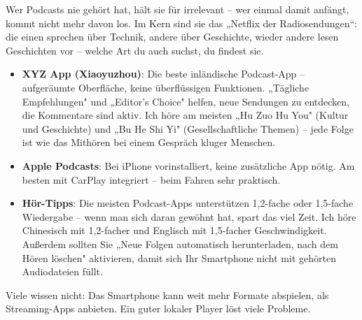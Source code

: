 
Wer Podcasts nie gehört hat, hält sie für irrelevant – wer einmal damit anfängt, kommt nicht mehr davon los. Im Kern sind sie das „Netflix der Radiosendungen“: die einen sprechen über Technik, andere über Geschichte, wieder andere lesen Geschichten vor – welche Art du auch suchst, du findest sie.

\begin{itemize}
  \item \textbf{XYZ App (Xiaoyuzhou)}: Die beste inländische Podcast-App – aufgeräumte Oberfläche, keine überflüssigen Funktionen. „Tägliche Empfehlungen" und „Editor's Choice" helfen, neue Sendungen zu entdecken, die Kommentare sind aktiv. Ich höre am meisten „Hu Zuo Hu You" (Kultur und Geschichte) und „Bu He Shi Yi" (Gesellschaftliche Themen) – jede Folge ist wie das Mithören bei einem Gespräch kluger Menschen.
  \item \textbf{Apple Podcasts}: Bei iPhone vorinstalliert, keine zusätzliche App nötig. Am besten mit CarPlay integriert – beim Fahren sehr praktisch.
  \item \textbf{Hör-Tipps}: Die meisten Podcast-Apps unterstützen 1,2-fache oder 1,5-fache Wiedergabe – wenn man sich daran gewöhnt hat, spart das viel Zeit. Ich höre Chinesisch mit 1,2-facher und Englisch mit 1,5-facher Geschwindigkeit. Außerdem sollten Sie „Neue Folgen automatisch herunterladen, nach dem Hören löschen" aktivieren, damit sich Ihr Smartphone nicht mit gehörten Audiodateien füllt.
\end{itemize}


Viele wissen nicht: Das Smartphone kann weit mehr Formate abspielen, als Streaming-Apps anbieten. Ein guter lokaler Player löst viele Probleme.

